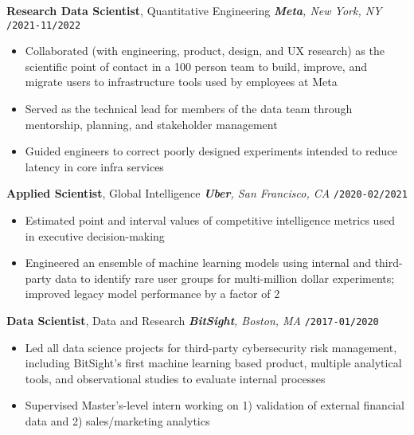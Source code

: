 \documentclass[10pt,english]{report}
\newcommand{\blockbreak} {
    \vspace{3mm}
}
\begin{document}
\blockbreak

\textbf{Research Data Scientist}, Quantitative Engineering \hfill \textit{\textbf{Meta}, New York, NY} \texttt{/2021-11/2022}
\begin{itemize}
    \item Collaborated (with engineering, product, design, and UX research) as the scientific point of contact in a 100 person team to build, improve, and migrate users to infrastructure tools used by employees at Meta
    \item Served as the technical lead for members of the data team through mentorship, planning, and stakeholder management
    \item Guided engineers to correct poorly designed experiments intended to reduce latency in core infra services
\end{itemize}

\blockbreak

\textbf{Applied Scientist}, Global Intelligence \hfill \textit{\textbf{Uber}, San Francisco, CA} \texttt{/2020-02/2021}
\begin{itemize}
    \item Estimated point and interval values of competitive intelligence metrics used in executive decision-making
    \item Engineered an ensemble of machine learning models using internal and third-party data to identify rare user groups for multi-million dollar experiments; improved legacy model performance by a factor of 2
\end{itemize}

\blockbreak

\textbf{Data Scientist}, Data and Research \hfill \textit{\textbf{BitSight}, Boston, MA} \texttt{/2017-01/2020}
\begin{itemize}
    \item Led all data science projects for third-party cybersecurity risk management, including BitSight's first machine learning based product, multiple analytical tools, and observational studies to evaluate internal processes
    \item Supervised Master's-level intern working on 1) validation of external financial data and 2) sales/marketing analytics
\end{itemize}
\end{document}
